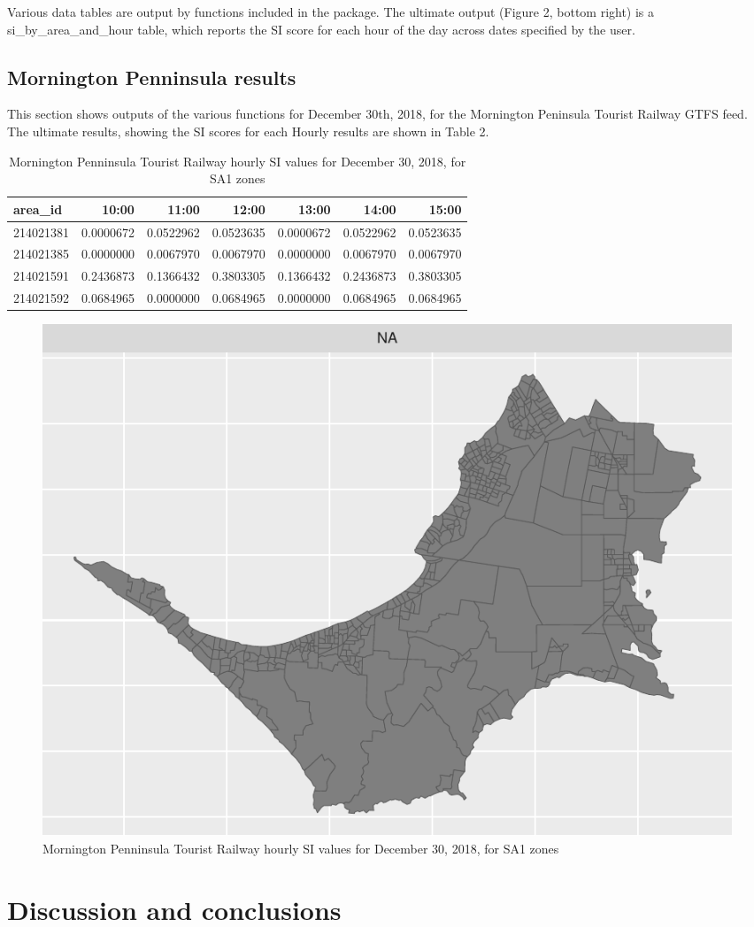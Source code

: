 \documentclass[preprint, 3p,
authoryear]{elsarticle} %
\begin{document}
Various data tables are output by functions included in the package. The
ultimate output (Figure 2, bottom right) is a si\_by\_area\_and\_hour
table, which reports the SI score for each hour of the day across dates
specified by the user.

\hypertarget{mornington-penninsula-results}{%
\subsection{Mornington Penninsula
results}\label{mornington-penninsula-results}}

This section shows outputs of the various functions for December 30th,
2018, for the Mornington Peninsula Tourist Railway GTFS feed. The
ultimate results, showing the SI scores for each Hourly results are
shown in Table 2.

\begin{table}

\caption{\label{tab:SI_mornington_20181230_output}Mornington Penninsula Tourist Railway hourly SI values for December 30, 2018, for SA1 zones}
\centering
\begin{tabular}[t]{l|r|r|r|r|r|r}
\hline
area\_id & 10:00 & 11:00 & 12:00 & 13:00 & 14:00 & 15:00\\
\hline
214021381 & 0.0000672 & 0.0522962 & 0.0523635 & 0.0000672 & 0.0522962 & 0.0523635\\
\hline
214021385 & 0.0000000 & 0.0067970 & 0.0067970 & 0.0000000 & 0.0067970 & 0.0067970\\
\hline
214021591 & 0.2436873 & 0.1366432 & 0.3803305 & 0.1366432 & 0.2436873 & 0.3803305\\
\hline
214021592 & 0.0684965 & 0.0000000 & 0.0684965 & 0.0000000 & 0.0684965 & 0.0684965\\
\hline
\end{tabular}
\end{table}

\begin{figure}
\centering
\includegraphics{Leveraging_GTFS_to_assess_transit_supply_Transport_Geography_files/figure-latex/SI_mornington_20181230_output-1.pdf}
\caption{Mornington Penninsula Tourist Railway hourly SI values for
December 30, 2018, for SA1 zones}
\end{figure}

\hypertarget{discussion-and-conclusions}{%
\section{Discussion and conclusions}\label{discussion-and-conclusions}}

\renewcommand\refname{References}

\end{document}
